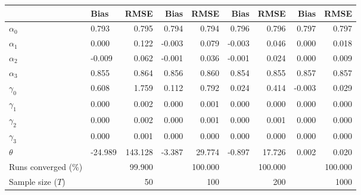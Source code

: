 
\begin{tabular}[t]{llrrrrrrr}
\toprule
  & Bias & RMSE & Bias & RMSE & Bias & RMSE & Bias & RMSE\\
\midrule
$\alpha_{0}$ & 0.793 & 0.795 & 0.794 & 0.794 & 0.796 & 0.796 & 0.797 & 0.797\\
$\alpha_{1}$ & 0.000 & 0.122 & -0.003 & 0.079 & -0.003 & 0.046 & 0.000 & 0.018\\
$\alpha_{2}$ & -0.009 & 0.062 & -0.001 & 0.036 & -0.001 & 0.024 & 0.000 & 0.009\\
$\alpha_{3}$ & 0.855 & 0.864 & 0.856 & 0.860 & 0.854 & 0.855 & 0.857 & 0.857\\
$\gamma_{0}$ & 0.608 & 1.759 & 0.112 & 0.792 & 0.024 & 0.414 & -0.003 & 0.029\\
$\gamma_{1}$ & 0.000 & 0.002 & 0.000 & 0.001 & 0.000 & 0.000 & 0.000 & 0.000\\
$\gamma_{2}$ & 0.000 & 0.002 & 0.000 & 0.001 & 0.000 & 0.001 & 0.000 & 0.000\\
$\gamma_{3}$ & 0.000 & 0.001 & 0.000 & 0.000 & 0.000 & 0.000 & 0.000 & 0.000\\
$\theta$ & -24.989 & 143.128 & -3.387 & 29.774 & -0.897 & 17.726 & 0.002 & 0.020\\
Runs converged (\%) &  & 99.900 &  & 100.000 &  & 100.000 &  & 100.000\\
Sample size ($T$) &  & 50 &  & 100 &  & 200 &  & 1000\\
\bottomrule
\end{tabular}
